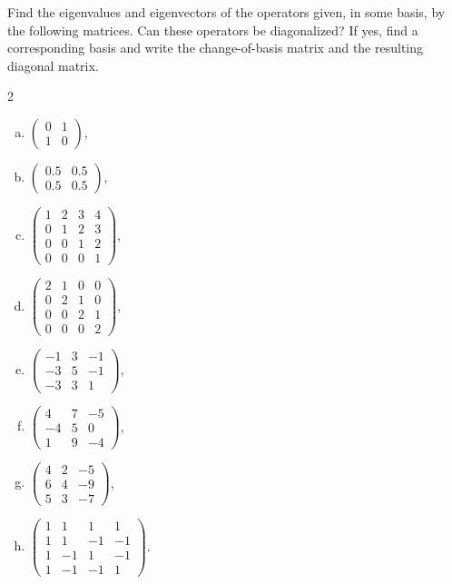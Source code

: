 \begin{problem}
Find the eigenvalues and eigenvectors of the operators given, in some basis, by the following matrices. Can these operators be diagonalized? If yes, find a corresponding basis and write the change-of-basis matrix and the resulting diagonal matrix.
\begin{multicols}{2}
\begin{enumerate}[a) ]
\item $\begin{pmatrix}0 & 1 \\ 1 & 0\end{pmatrix}$,
\item $\begin{pmatrix}0.5 & 0.5 \\ 0.5 & 0.5\end{pmatrix}$,
\item $\begin{pmatrix}1 & 2 & 3 & 4 \\ 0 & 1 & 2 & 3 \\ 0 & 0 & 1 & 2 \\ 0 & 0 & 0 & 1\end{pmatrix}$,
\item $\begin{pmatrix}2 & 1 & 0 & 0 \\ 0 & 2 & 1 & 0 \\ 0 & 0 & 2 & 1 \\ 0 & 0 & 0 & 2\end{pmatrix}$,
\item $\begin{pmatrix}-1 & 3 & -1 \\ -3 & 5 & -1 \\ -3 & 3 & 1\end{pmatrix}$,
\item $\begin{pmatrix}4 & 7 & -5 \\ -4 & 5 & 0 \\ 1 & 9 & -4\end{pmatrix}$,
\item $\begin{pmatrix}4 & 2 & -5 \\ 6 & 4 & -9 \\ 5 & 3 & -7\end{pmatrix}$,
\item $\begin{pmatrix}1 & 1 & 1 & 1 \\ 1 & 1 & -1 & -1 \\ 1 & -1 & 1 & -1 \\ 1 & -1 & -1 & 1\end{pmatrix}$.
\end{enumerate}
\end{multicols}
\end{problem}

